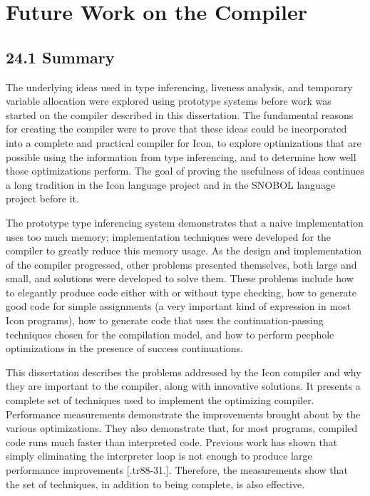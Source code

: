 \chapter{Future Work on the Compiler}

\section[24.1 Summary]{24.1 Summary}

The underlying ideas used in type inferencing, liveness analysis, and
temporary variable allocation were explored using prototype systems
before work was started on the compiler described in this
dissertation. The fundamental reasons for creating the compiler were
to prove that these ideas could be incorporated into a complete and
practical compiler for Icon, to explore optimizations that are
possible using the information from type inferencing, and to determine
how well those optimizations perform. The goal of proving the
usefulness of ideas continues a long tradition in the Icon language
project and in the SNOBOL language project before it.

The prototype type inferencing system demonstrates that a naive
implementation uses too much memory; implementation techniques were
developed for the compiler to greatly reduce this memory usage. As the
design and implementation of the compiler progressed, other problems
presented themselves, both large and small, and solutions were
developed to solve them. These problems include how to elegantly
produce code either with or without type checking, how to generate
good code for simple assignments (a very important kind of expression
in most Icon programs), how to generate code that uses the
continuation-passing techniques chosen for the compilation model, and
how to perform peephole optimizations in the presence of success
continuations.

This dissertation describes the problems addressed by the Icon
compiler and why they are important to the compiler, along with
innovative solutions. It presents a complete set of techniques used to
implement the optimizing compiler.  Performance measurements
demonstrate the improvements brought about by the various
optimizations. They also demonstrate that, for most programs, compiled
code runs much faster than interpreted code. Previous work has shown
that simply eliminating the interpreter loop is not enough to produce
large performance improvements [.tr88-31.]. Therefore, the
measurements show that the set of techniques, in addition to being
complete, is also effective.



